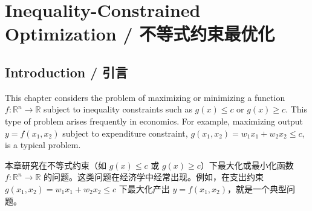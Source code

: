 
\setcounter{chapter}{12}

\chapter{Inequality-Constrained Optimization / 不等式约束最优化}

\section{Introduction / 引言}

\begin{original}
This chapter considers the problem of maximizing or minimizing a function $f: \mathbb{R}^n \to \mathbb{R}$ subject to inequality constraints such as $g(x) \le c$ or $g(x) \ge c$. This type of problem arises frequently in economics. For example, maximizing output $y = f(x_1, x_2)$ subject to expenditure constraint, $g(x_1, x_2) = w_1x_1 + w_2x_2 \le c$, is a typical problem.
\end{original}
\begin{translation}
本章研究在不等式约束（如 $g(x) \le c$ 或 $g(x) \ge c$）下最大化或最小化函数 $f: \mathbb{R}^n \to \mathbb{R}$ 的问题。这类问题在经济学中经常出现。例如，在支出约束 $g(x_1, x_2) = w_1x_1 + w_2x_2 \le c$ 下最大化产出 $y = f(x_1, x_2)$，就是一个典型问题。
\end{translation}

